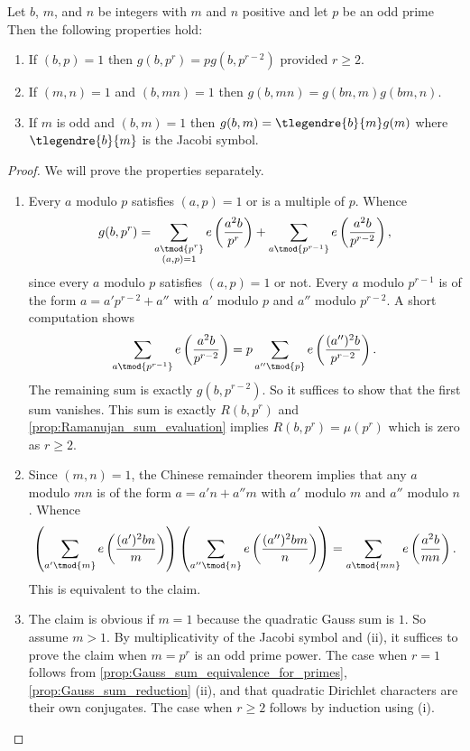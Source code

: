\documentclass[12pt]{article}
\begin{document}
      \begin{proposition}\label{prop:quadratic_Gauss_sum_reduction}
        Let \(b\), \(m\), and \(n\) be integers with \(m\) and \(n\) positive and let \(p\) be an odd prime Then the following properties hold:
        \begin{enumerate}[label*=(\roman*)]
          \item If \((b,p) = 1\) then \(g(b,p^{r}) = pg(b,p^{r-2})\) provided \(r \ge 2\).
          \item If \((m,n) = 1\) and \((b,mn) = 1\) then \(g(b,mn) = g(bn,m)g(bm,n)\).
          \item If \(m\) is odd and \((b,m) = 1\) then \(g(b,m) = \tlegendre{b}{m}g(m)\) where \(\tlegendre{b}{m}\) is the Jacobi symbol.
        \end{enumerate}
      \end{proposition}
      \begin{proof}
        We will prove the properties separately.
        \begin{enumerate}[label*=(\roman*)]
          \item Every \(a\) modulo \(p\) satisfies \((a,p) = 1\) or is a multiple of \(p\). Whence
          \[
            g(b,p^{r}) = \sum_{\substack{a \tmod{p^{r}} \\ (a,p) = 1}}e\left(\frac{a^{2}b}{p^{r}}\right)+\sum_{a \tmod{p^{r-1}}}e\left(\frac{a^{2}b}{p^{r-2}}\right),
          \]
          since every \(a\) modulo \(p\) satisfies \((a,p) = 1\) or not. Every \(a\) modulo \(p^{r-1}\) is of the form \(a = a'p^{r-2}+a''\) with \(a'\) modulo \(p\) and \(a''\) modulo \(p^{r-2}\). A short computation shows
          \[
            \sum_{a \tmod{p^{r-1}}}e\left(\frac{a^{2}b}{p^{r-2}}\right) = p\sum_{a'' \tmod{p}}e\left(\frac{(a'')^{2}b}{p^{r-2}}\right).
          \]
          The remaining sum is exactly \(g(b,p^{r-2})\). So it suffices to show that the first sum vanishes. This sum is exactly \(R(b,p^{r})\) and \cref{prop:Ramanujan_sum_evaluation} implies \(R(b,p^{r}) = \mu(p^{r})\) which is zero as \(r \ge 2\).
          \item Since \((m,n) = 1\), the Chinese remainder theorem implies that any \(a\) modulo \(mn\) is of the form \(a = a'n+a''m\) with \(a'\) modulo \(m\) and \(a''\) modulo \(n\). Whence
          \[
            \left(\sum_{a' \tmod{m}}e\left(\frac{(a')^{2}bn}{m}\right)\right)\left(\sum_{a'' \tmod{n}}e\left(\frac{(a'')^{2}bm}{n}\right)\right) = \sum_{a \tmod{mn}}e\left(\frac{a^{2}b}{mn}\right).
          \]
          This is equivalent to the claim.
          \item The claim is obvious if \(m = 1\) because the quadratic Gauss sum is \(1\). So assume \(m > 1\). By multiplicativity of the Jacobi symbol and (ii), it suffices to prove the claim when \(m = p^{r}\) is an odd prime power. The case when \(r = 1\) follows from \cref{prop:Gauss_sum_equivalence_for_primes}, \cref{prop:Gauss_sum_reduction} (ii), and that quadratic Dirichlet characters are their own conjugates. The case when \(r \ge 2\) follows by induction using (i).
        \end{enumerate}
      \end{proof}
\end{document}
